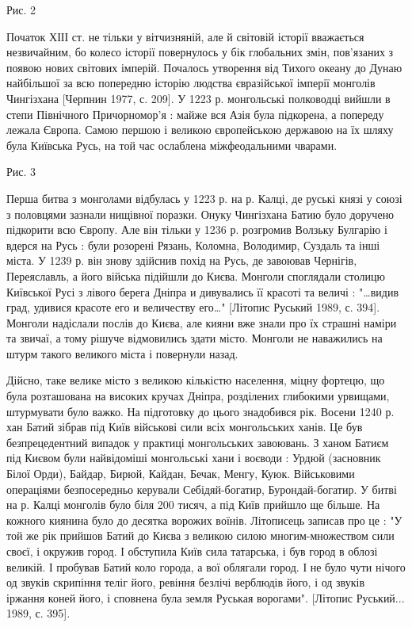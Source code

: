Рис. 2

Початок ХІІІ ст. не тільки у вітчизняній, але й світовій історії вважається
незвичайним, бо колесо історії повернулось у бік глобальних змін, пов'язаних з
появою нових світових імперій. Почалось утворення від Тихого океану до Дунаю
найбільшої за всю попередню історію людства євразійської імперії монголів
Чингізхана [Черпнин 1977, с. 209]. У 1223 р. монгольські полководці вийшли в
степи Північного Причорномор'я : майже вся Азія була підкорена, а попереду
лежала Європа. Самою першою і великою європейською державою на їх шляху була
Київська Русь, на той час ослаблена міжфеодальними чварами.

Рис. 3

Перша битва з монголами відбулась у 1223 р. на р. Калці, де руські князі у
союзі з половцями зазнали нищівної поразки. Онуку Чингізхана Батию було
доручено підкорити всю Європу. Але він тільки у 1236 р. розгромив Волзьку
Булгарію і вдерся на Русь : були розорені Рязань, Коломна, Володимир, Суздаль
та інші міста. У 1239 р. він знову здійснив похід на Русь, де завоював
Чернігів, Переяславль, а його війська підійшли до Києва. Монголи споглядали
столицю Київської Русі з лівого берега Дніпра и дивувались її красоті та величі
: "…видив град, удивися красоте его и величеству его…" [Літопис Руський 1989,
с. 394]. Монголи надіслали послів до Києва, але кияни вже знали про їх страшні
наміри та звичаї, а тому рішуче відмовились здати місто. Монголи не наважились
на штурм такого великого міста і повернули назад.

Дійсно, таке велике місто з великою кількістю населення, міцну фортецю, що була
розташована на високих кручах Дніпра, розділених глибокими урвищами, штурмувати
було важко. На підготовку до цього знадобився рік. Восени 1240 р. хан Батий
зібрав під Київ військові сили всіх монгольських ханів. Це був безпрецедентний
випадок у практиці монгольських завоювань. З ханом Батиєм під Києвом були
найвідоміші монгольські хани і воєводи : Урдюй (засновник Білої Орди), Байдар,
Бирюй, Кайдан, Бечак, Менгу, Куюк. Військовими операціями безпосередньо
керували Себідяй-богатир, Бурондай-богатир. У битві на р. Калці монголів було
біля 200 тисяч, а під Київ прийшло ще більше. На кожного киянина було до
десятка ворожих воїнів. Літописець записав про це : "У той же рік прийшов Батий
до Києва з великою силою многим-множеством сили своєї, і окружив город. І
обступила Київ сила татарська, і був город в облозі великій. І пробував Батий
коло города, а вої облягали город. І не було чути нічого од звуків скрипіння
теліг його, ревіння безлічі верблюдів його, і од звуків іржання коней його, і
сповнена була земля Руськая ворогами". [Літопис Руський... 1989, с. 395].

